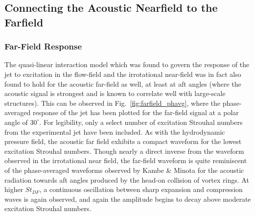 \documentclass[english]{aiaa-tc}
\begin{document}
\subsection{Connecting the Acoustic Nearfield to the Farfield}
\subsubsection{Far-Field Response}
The quasi-linear interaction model which was found to govern the response of the jet to excitation in the flow-field and the irrotational near-field was in fact also found to hold for the acoustic far-field as well, at least at aft angles (where the acoustic signal is strongest and is known to correlate well with large-scale structures).
This can be observed in Fig.~\ref{fig:farfield_phavg}, where the phase-averaged response of the jet has been plotted for the far-field signal at a polar angle of $30^\circ$.
For legibility, only a select number of excitation Strouhal numbers from the experimental jet have been included.
As with the hydrodynamic pressure field, the acoustic far field exhibits a compact waveform for the lowest excitation Strouhal numbers.
Though nearly a direct inverse from the waveform observed in the irrotational near field, the far-field waveform is quite reminiscent of the phase-averaged waveforms observed by Kambe \& Minota \cite{Kambe1983} for the acoustic radiation towards aft angles produced by the head-on collision of vortex rings.
At higher $St_{DF}$, a continuous oscillation between sharp expansion and compression waves is again observed, and again the amplitude begins to decay above moderate excitation Strouhal numbers.
\end{document}

